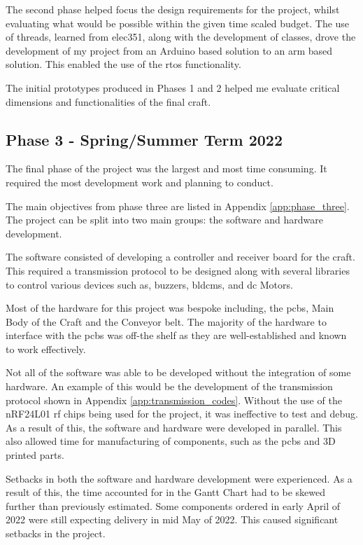 \documentclass [11pt]{article}
\begin{document}
The second phase helped focus the design requirements for the project, whilst evaluating what would be possible within the given time scaled budget. The use of threads, learned from \gls{elec351}, along with the development of classes, drove the development of my project from an Arduino based solution to an \gls{arm} based solution. This enabled the use of the \gls{rtos} functionality. 

The initial prototypes produced in Phases 1 and 2 helped me evaluate critical dimensions and functionalities of the final craft.

\subsection{Phase 3 - Spring/Summer Term 2022} 

The final phase of the project was the largest and most time consuming. It required the most development work and planning to conduct. 

The main objectives from phase three are listed in Appendix \ref{app:phase_three}. The project can be split into two main groups: the software and hardware development. 

The software consisted of developing a controller and receiver board for the craft. This required a transmission protocol to be designed along with several libraries to control various devices such as, buzzers, \gls{bldcm}s, and \gls{dc} Motors. 

Most of the hardware for this project was bespoke including, the \gls{pcb}s, Main Body of the Craft and the Conveyor belt. The majority of the hardware to interface with the \gls{pcb}s was off-the shelf as they are well-established and known to work effectively.

Not all of the software was able to be developed without the integration of some hardware. An example of this would be the development of the transmission protocol shown in Appendix \ref{app:transmission_codes}. Without the use of the nRF24L01 \gls{rf} chips being used for the project, it was ineffective to test and debug. As a result of this, the software and hardware were developed in parallel. This also allowed time for manufacturing of components, such as the \gls{pcb}s and 3D printed parts.

Setbacks in both the software and hardware development were experienced. As a result of this, the time accounted for in the Gantt Chart had to be skewed further than previously estimated. Some components ordered in early April of 2022 were still expecting delivery in mid May of 2022. This caused significant setbacks in the project. 
\end{document}
